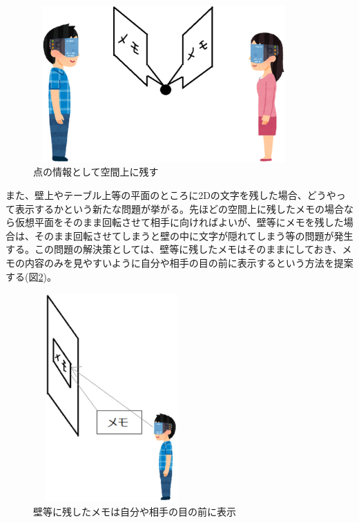 \documentclass[11pt,a4j, titlepage]{jarticle} %
\begin{document}
\begin{figure}[H]
  \begin{center}
    \includegraphics[clip,height=6.0cm,width=10.0cm]{./memo_ten.eps}
    \caption{点の情報として空間上に残す}
    \label{fig:memo_ten}
  \end{center}
\end{figure}

また、壁上やテーブル上等の平面のところに2Dの文字を残した場合、どうやって表示するかという新たな問題が挙がる。先ほどの空間上に残したメモの場合なら仮想平面をそのまま回転させて相手に向ければよいが、壁等にメモを残した場合は、そのまま回転させてしまうと壁の中に文字が隠れてしまう等の問題が発生する。この問題の解決策としては、壁等に残したメモはそのままにしておき、メモの内容のみを見やすいように自分や相手の目の前に表示するという方法を提案する(図\ref{fig:memo_wall})。

\begin{figure}[H]
  \begin{center}
    \includegraphics[clip,height=8.0cm,width=6.0cm]{./memo_wall.eps}
    \caption{壁等に残したメモは自分や相手の目の前に表示}
    \label{fig:memo_wall}
  \end{center}
\end{figure}
\end{document}
